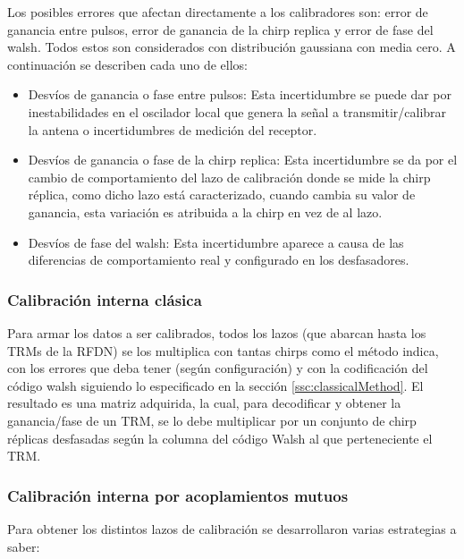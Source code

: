 Los posibles errores que afectan directamente a los calibradores son: error de ganancia entre pulsos, error de ganancia de la
chirp replica y error de fase del walsh. Todos estos son considerados con distribución gaussiana con media cero. A continuación se
describen cada uno de ellos:
\begin{itemize}
	\item Desvíos de ganancia o fase entre pulsos: Esta incertidumbre se puede dar por inestabilidades en el oscilador local que
		genera la señal a transmitir/calibrar la antena o incertidumbres de medición del receptor.
	\item Desvíos de ganancia o fase de la chirp replica: Esta incertidumbre se da por el cambio de comportamiento del lazo de
		calibración donde se mide la chirp réplica, como dicho lazo está caracterizado, cuando cambia su valor de ganancia, esta
		variación es atribuida a la chirp en vez de al lazo.
	\item Desvíos de fase del walsh: Esta incertidumbre aparece a causa de las diferencias de comportamiento real y configurado en
		los desfasadores. 
\end{itemize}


\subsubsection{Calibración interna clásica}

Para armar los datos a ser calibrados, todos los lazos (que abarcan hasta los TRMs de la RFDN) se los multiplica con 
tantas chirps como el método indica, con los errores que deba tener (según configuración) y con la codificación del código 
walsh siguiendo lo especificado en la sección \ref{ssc:classicalMethod}. El resultado es una matriz adquirida, la cual, para
decodificar y obtener la ganancia/fase de un TRM, se lo debe multiplicar por un conjunto de chirp réplicas desfasadas según la 
columna del código Walsh al que perteneciente el TRM. 


\subsubsection{Calibración interna por acoplamientos mutuos}

Para obtener los distintos lazos de calibración se desarrollaron varias estrategias a saber: 

